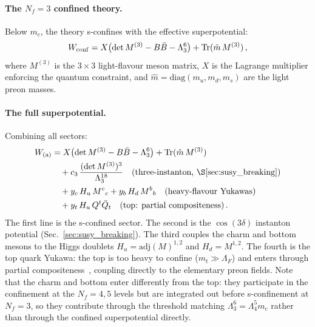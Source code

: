 \documentclass[aps,prd,twocolumn,showpacs,preprintnumbers,superscriptaddress,floatfix]{revtex4-2}
\newcommand{\Nf}{N_{\!f}}
\newcommand{\Tr}{\mathrm{Tr}}
\newcommand{\adj}{\mathrm{adj}}
\newcommand{\diag}{\mathrm{diag}}
\begin{document}
\paragraph{The $\Nf = 3$ confined theory.}
Below $m_c$, the theory s-confines with the effective
superpotential:
\begin{equation}
  W_{\rm conf} = X\bigl(\det M^{(3)} - B\bar{B} - \Lambda_3^6\bigr)
    + \Tr(\hat{m}\,M^{(3)})\,,
  \label{eq:W_conf}
\end{equation}
where $M^{(3)}$ is the $3 \times 3$ light-flavour meson matrix,
$X$ is the Lagrange multiplier enforcing the quantum constraint,
and $\hat{m} = \diag(m_u, m_d, m_s)$ are the light preon masses.

\paragraph{The full superpotential.}
Combining all sectors:
\begin{align}
  W_{\rm (a)} &= X\bigl(\det M^{(3)} - B\bar{B} - \Lambda_3^6\bigr)
    + \Tr(\hat{m}\,M^{(3)})
    \nonumber\\
  &\quad + c_3\,\frac{(\det M^{(3)})^3}{\Lambda_3^{18}}
    \quad\text{(three-instanton, \S\ref{sec:susy_breaking})}
    \nonumber\\
  &\quad + y_c\,H_u\,M^c{}_c + y_b\,H_d\,M^b{}_b
    \quad\text{(heavy-flavour Yukawas)}
    \nonumber\\
  &\quad + y_t\,H_u\,Q^t\bar{Q}_t
    \quad\text{(top: partial compositeness)}\,.
  \label{eq:W_scenario_a}
\end{align}
The first line is the s-confined sector.
The second is the $\cos(3\delta)$ instanton potential
(Sec.~\ref{sec:susy_breaking}).
The third couples the charm and bottom mesons to the Higgs
doublets $H_u = \adj(M)^{1,2}$ and $H_d = M^{1,2}$.
The fourth is the top quark Yukawa: the top is too heavy to
confine ($m_t \gg \Lambda_F$) and enters through partial
compositeness~\cite{Kaplan:1991dc}, coupling directly to the
elementary preon fields.
Note that the charm and bottom enter differently from the top:
they participate in the confinement at the $\Nf = 4, 5$ levels
but are integrated out before s-confinement at $\Nf = 3$, so
they contribute through the threshold matching
$\Lambda_3^6 = \Lambda_4^5 m_c$ rather than through the
confined superpotential directly.
\end{document}
